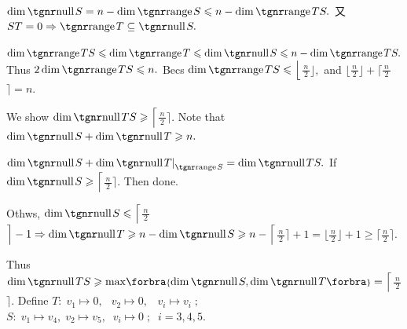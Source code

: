\Or $\dim\null S=n-\dim\range S\leqslant n-\dim\range TS.$ \;又 $ST=0\Rightarrow\range T\subseteq\null S.$\par\quad
$\dim\range TS\leqslant\dim\range T\leqslant\dim\null S\leqslant n-\dim\range TS.$ \;Thus \;$2\dim\range TS\leqslant n.$\PfEnd\vspace{8pt}\quad
\Or Becs $\dim\range TS\leqslant\Big\lfloor${\Large$\frac{\,n\,}{2}$}$\Big\rfloor,$ and $\Big\lfloor${\Large$\frac{\,n\,}{2}$}$\Big\rfloor+\Big\lceil${\Large$\frac{\,n\,}{2}$}$\Big\rceil=n.$\par\vspace{3pt}\quad
We show $\dim\null TS\geqslant\Big\lceil${\Large$\frac{\,n\,}{2}$}$\Big\rceil.$ Note that $\dim\null S+\dim\null T\geqslant n.$\par\vspace{3pt}\quad
$\dim\null S+\dim\null T\mmid_{\range S}=\dim\null TS.$ \;If $\dim\null S\geqslant\Big\lceil${\Large$\frac{\,n\,}{2}$}$\Big\rceil.$ Then done.\par\vspace{3pt}\quad
Othws, $\dim\null S\leqslant\Big\lceil${\Large$\frac{\,n\,}{2}$}$\Big\rceil-1\Rightarrow\dim\null T\geqslant n-\dim\null S\geqslant n-\Big\lceil${\Large$\frac{\,n\,}{2}$}$\Big\rceil+1=\Big\lfloor${\Large$\frac{\,n\,}{2}$}$\Big\rfloor+1\geqslant\Big\lceil${\Large$\frac{\,n\,}{2}$}$\Big\rceil.$\par\vspace{3pt}\quad
Thus $\dim\null TS\geqslant\max\!\Bra{{\dim\null S,\dim\null T}}=\Big\lceil${\Large$\frac{\,n\,}{2}$}$\Big\rceil.$\PfEnd\vspace{6pt}\quad
\AExa Define $T: \; v_1\mapsto 0, \;\;\, v_2\mapsto 0, \;\;\; v_i\mapsto v_i\;;$ \;\; $S: \; v_1\mapsto v_4, \; v_2\mapsto v_5, \;\; v_i\mapsto 0\;;\;\; i=3,4,5.$
\SepLine\pagebreak

